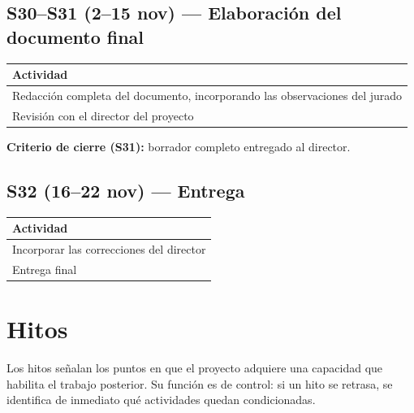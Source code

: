 \documentclass[12pt,letterpaper]{article}
\begin{document}
\subsection{S30--S31 (2--15 nov) --- Elaboración del documento final}

\begin{table}[H]
    \centering
    \small
    \begin{tabular}{@{}p{13.8cm}@{}}
        \toprule
        \textbf{Actividad} \\ \midrule
        Redacción completa del documento, incorporando las observaciones del jurado \\
        Revisión con el director del proyecto \\ \bottomrule
    \end{tabular}
\end{table}

\textbf{Criterio de cierre (S31):} borrador completo entregado al director.

\subsection{S32 (16--22 nov) --- Entrega}

\begin{table}[H]
    \centering
    \small
    \begin{tabular}{@{}p{13.8cm}@{}}
        \toprule
        \textbf{Actividad} \\ \midrule
        Incorporar las correcciones del director \\
        Entrega final \\ \bottomrule
    \end{tabular}
\end{table}

\section{Hitos}

Los hitos señalan los puntos en que el proyecto adquiere una capacidad que habilita el trabajo posterior. Su función es de control: si un hito se retrasa, se identifica de inmediato qué actividades quedan condicionadas.
\end{document}

